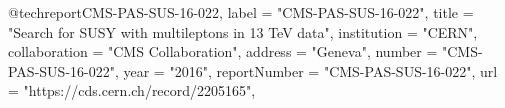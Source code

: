 @techreport{CMS-PAS-SUS-16-022,
      label          = "CMS-PAS-SUS-16-022",
      title         = "{Search for SUSY with multileptons in 13 TeV data}",
      institution   = "CERN",
      collaboration = "CMS Collaboration",
      address       = "Geneva",
      number        = "CMS-PAS-SUS-16-022",
      year          = "2016",
      reportNumber  = "CMS-PAS-SUS-16-022",
      url           = "https://cds.cern.ch/record/2205165",
}

